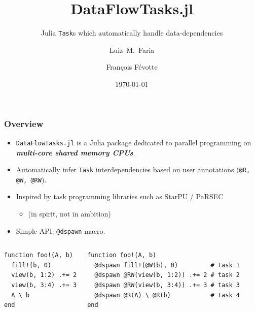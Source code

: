 \documentclass{beamer}
\title[DataFlowTasks] %
{DataFlowTasks.jl}
\subtitle{Julia \texttt{Task}s which automatically handle data-dependencies}
\author[Faria, Févotte] %
{Luiz~M.~Faria\inst{1} \and François Févotte\inst{2}}
\institute[]
{
    \inst{1}%
    Research scientist\\
    INRIA
    \and
    \inst{2}%
    Chief Scientist\\
    TriScale innov
}
\date{\today}
\newcommand{\DFT}{\texttt{DataFlowTasks.jl}}
\begin{document}
\frame{\titlepage}

\begin{frame}[fragile]
\frametitle{Overview}

\begin{itemize}
    \item \DFT{} is a Julia package dedicated to parallel programming on
      \textit{\textbf{multi-core shared memory CPUs}}.
    \item Automatically infer \texttt{Task} interdependencies based on user annotations (\texttt{@R, @W, @RW}).
    \item Inspired by task programming libraries such as StarPU / PaRSEC
      \begin{itemize}
      \item (in spirit, not in ambition)
      \end{itemize}
    \item Simple API: \texttt{@dspawn} macro.
\end{itemize}
%
\begin{columns}[t]
\begin{exampleblock}{}
\begin{verbatim}
function foo!(A, b)
  fill!(b, 0)
  view(b, 1:2) .+= 2
  view(b, 3:4) .+= 3
  A \ b
end
\end{verbatim}
\end{exampleblock}
\center {}
 

\begin{exampleblock}{}
\begin{verbatim}
function foo!(A, b)
  @dspawn fill!(@W(b), 0)         # task 1
  @dspawn @RW(view(b, 1:2)) .+= 2 # task 2
  @dspawn @RW(view(b, 3:4)) .+= 3 # task 3
  @dspawn @R(A) \ @R(b)           # task 4
end
\end{verbatim}
\end{exampleblock}
\center {}

\end{columns}


\end{frame}
\end{document}
